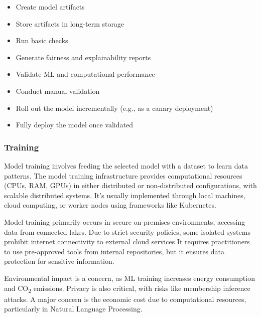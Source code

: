\begin{itemize}
    \item Create model artifacts
    \item Store artifacts in long-term storage
    \item Run basic checks
    \item Generate fairness and explainability reports
\end{itemize}
\begin{itemize}
    \item Validate ML and computational performance
    \item Conduct manual validation
\end{itemize}
\begin{itemize}
    \item Roll out the model incrementally (e.g., as a canary deployment)
    \item Fully deploy the model once validated
\end{itemize}

\subsubsection{Training}

Model training involves feeding the selected model with a dataset to learn data patterns.
The model training infrastructure provides computational resources (CPUs, RAM, GPUs) in either distributed or non-distributed configurations, with scalable distributed systems.
It's usually implemented through local machines, cloud computing, or worker nodes using frameworks like Kubernetes\cite{Kreuzberger2022MachineLO, Haakman2021}.

Model training primarily occurs in secure on-premises environments, accessing data from connected lakes\cite{Haakman2021}.
Due to strict security policies, some isolated systems prohibit internet connectivity to external cloud services
It requires practitioners to use pre-approved tools from internal repositories, but it ensures data protection for sensitive information\cite{Haakman2021}.

Environmental impact is a concern, as ML training increases energy consumption and CO\textsubscript{2} emissions\cite{10.1145/3533378}.
Privacy is also critical, with risks like membership inference attacks\cite{10.1145/3533378, 10.1145/3555803}.
A major concern is the economic cost due to computational resources, particularly in Natural Language Processing\cite{10.1145/3533378}.

